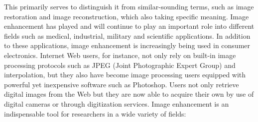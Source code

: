 This primarily serves to distinguish it from similar-sounding terms, such as image restoration and image reconstruction, which also taking specific meaning. Image enhancement has played and will continue to play an important role into different fields such as medical, industrial, military and scientific applications. In addition to these applications, image enhancement is increasingly being used in consumer electronics. Internet Web users, for instance, not only rely on built-in image processing protocols such as JPEG (Joint Photographic Expert Group) and interpolation, but they also have become image processing users equipped with powerful yet inexpensive software such as Photoshop. Users not only retrieve digital images from the Web but they are now able to acquire their own by use of digital cameras or through digitization services. Image enhancement is an indispensable tool for researchers in a wide variety of fields:
